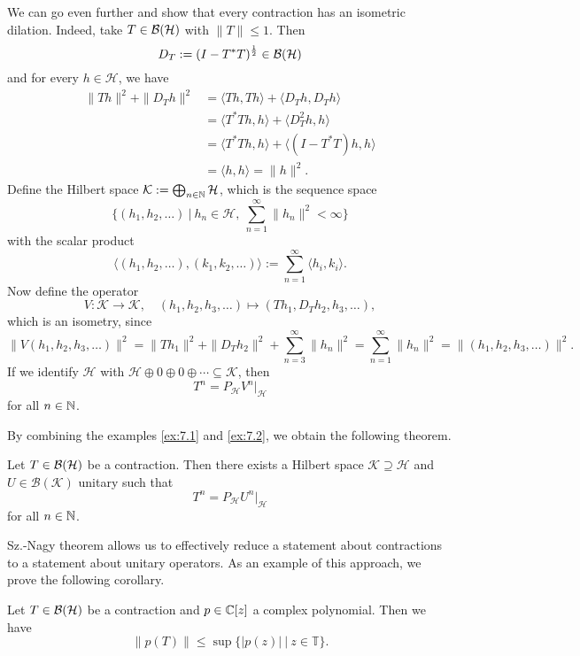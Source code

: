 \begin{example}\label{ex:7.2}
    We can go even further and show that every contraction has an isometric dilation.
    Indeed, take $T \in \operatorname{\mathcal{B} (\mathcal{H})}$ with $\| T\| \leq 1$. Then 
    $$D_T := (I - T^* T)^{\frac{1}{2}} \in \operatorname{\mathcal{B} (\mathcal{H})}$$ and for every $h \in \mathcal{H}$, we have 
    \begin{align*}
        \| T h \|^2 + \| D_T h\|^2 &= \langle Th, Th \rangle + \langle D_T h, D_T h \rangle\\
        &= \langle T^* T h, h\rangle + \langle D_T ^2 h, h\rangle\\
        &= \langle T^* T h, h\rangle + \langle (I - T^* T) h, h\rangle\\
        &= \langle h, h \rangle = \| h\|^2.
    \end{align*}
    Define the Hilbert space $\mathcal{K} := \bigoplus_{n \in \mathbb {N}} \mathcal{H}$, which is the sequence space
    $$\{(h_1, h_2, \dots)\ |\ h_n \in \mathcal{H},\ \sum_{n = 1} ^\infty \| h_n\|^2 < \infty\}$$
    with the scalar product 
    $$\langle (h_1, h_2, \dots), (k_1, k_2, \dots) \rangle := \sum_{n = 1} ^\infty \langle h_i, k_i \rangle.$$
    Now define the operator 
    $$V: \mathcal{K} \to \mathcal{K},\quad (h_1, h_2,h_3, \dots) \mapsto (T h_1, D_T h_2, h_3, \dots),$$
    which is an isometry, since 
    $$\| V(h_1, h_2, h_3, \dots)\|^2 = \| T h_1\|^2 + \| D_T h_2\|^2 + \sum_{n = 3} ^\infty \| h_n\|^2 = \sum_{n = 1} ^\infty \| h_n\|^2 = \| (h_1, h_2, h_3, \dots )\|^2.$$
    If we identify $\mathcal{H}$ with $\mathcal{H} \oplus 0 \oplus 0 \oplus \cdots \subseteq \mathcal{K}$, then 
    $$T^n = P_{\mathcal{H}} V^n \big|_{\mathcal{H}}$$
    for all $n \in \mathbb {N}$.
\end{example}

By combining the examples \ref{ex:7.1} and \ref{ex:7.2}, we obtain the following theorem.

\begin{theorem}[Sz.-Nagy]
    Let $T \in \operatorname{\mathcal{B} (\mathcal{H})}$ be a contraction. Then there exists a Hilbert space $\mathcal{K} \supseteq \mathcal{H}$ 
    and $U \in \mathcal{B}(\mathcal{K})$ unitary such that 
    $$T^n = P_{\mathcal{H}} U^n \big|_{\mathcal{H}}$$
    for all $n \in \mathbb {N}$.
\end{theorem}

Sz.-Nagy theorem allows us to effectively reduce a statement about contractions to a statement about unitary operators.
As an example of this approach, we prove the following corollary.

\begin{corollary}
    Let $T \in \operatorname{\mathcal{B} (\mathcal{H})}$ be a contraction and $p \in \mathbb {C} [z]$ a complex polynomial. Then we have 
    $$\| p(T)\| \leq \sup \{|p(z)|\ |\ z \in \mathbb{T}\}.$$
\end{corollary}

